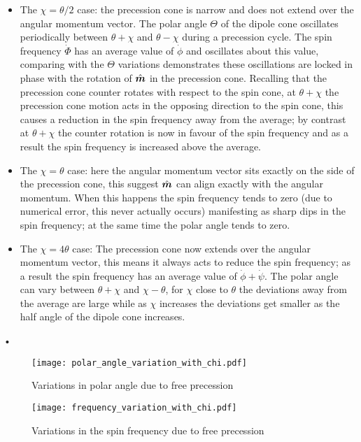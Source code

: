 \documentclass[../full_thesis/full_thesis.tex]{subfiles}
\begin{document}
\begin{itemize}
\item The $\chi = \theta/2$ case: the precession cone is narrow and does not
extend over the angular momentum vector. The polar angle $\Theta$ of the dipole
cone oscillates periodically between $\theta+\chi$ and $\theta-\chi$
during a precession cycle. The spin frequency $\dot{\Phi}$ has an average value
of $\dot{\phi}$ and
oscillates about this value, comparing with the $\Theta$ variations
demonstrates these oscillations are locked in phase with the rotation of $\hat{\boldsymbol{m}}$
in the precession cone. Recalling that the precession cone counter rotates with
respect to the spin cone, at $\theta+\chi$ the precession cone motion acts in
the opposing direction to the spin cone, this causes a reduction in the spin
frequency away from the average; by contrast at $\theta+\chi$ the counter
rotation is now in favour of the spin frequency and as a result the spin
frequency is increased above the average.

\item The $\chi = \theta$ case: here the angular momentum vector sits exactly
on the side of the precession cone, this suggest $\hat{\boldsymbol{m}}$ can align exactly with
the angular momentum. When this happens the spin frequency tends to zero (due
to numerical error, this never actually occurs) manifesting as sharp dips in the
spin frequency; at the same time the polar angle tends to zero.

\item The $\chi = 4\theta$ case: The precession cone now extends over the
angular momentum vector, this means it always acts to reduce the spin
frequency; as a result the spin frequency has an average value of
$\dot{\phi} + \dot{\psi}$. The polar angle can vary between $\theta+\chi$ and
$\chi-\theta$, for $\chi$ close to $\theta$ the deviations away from the
average are large while as $\chi$ increases the deviations get smaller as
the half angle of the dipole cone increases.
\end{itemize}•

\begin{figure}[ht]
\centering
  \texttt{[image: polar\_angle\_variation\_with\_chi.pdf]}
\caption{Variations in polar angle due to free precession}
\label{fig: polar angle variations}
\end{figure}

\begin{figure}[ht]
\centering
  \texttt{[image: frequency\_variation\_with\_chi.pdf]}
\caption{Variations in the spin frequency due to free precession}
\label{fig: frequency variations}
\end{figure}
\end{document}
